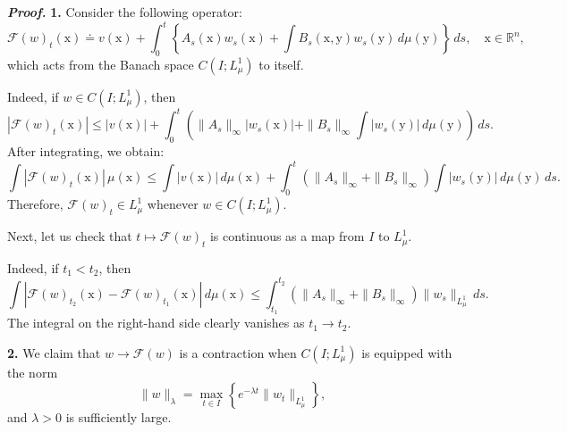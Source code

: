 \documentclass[sn-mathphys-num]{sn-jnl}
\numberwithin{equation}{section}
\theoremstyle{mythm}
\theoremstyle{mydef}
\renewenvironment{proof}{\smallskip\noindent\emph{\textbf{Proof.}}%
  \hspace{1pt}}{\hspace{-5pt}{\nobreak\quad\nobreak\hfill\nobreak%
    $\square$\vspace{2pt}\par}\smallskip\goodbreak}
\renewcommand{\d}{\,d}
\begin{document}
\begin{proof}
\textbf{1.} Consider the following operator:
\[
\mathcal{F}(w)_t(\mathrm{x}) \doteq v(\mathrm{x}) + \int_{0}^t \left\{A_s(\mathrm{x}) w_s(\mathrm{x}) + \int B_s(\mathrm{x},\mathrm{y}) w_s(\mathrm{y}) \d \mu(\mathrm{y}) \right\} \, ds, \quad \mathrm{x} \in \mathbb{R}^n,
\]
which acts from the Banach space \( C\left(I;L^1_{\mu}\right) \) to itself.

Indeed, if \( w \in C\left(I;L^1_{\mu}\right) \), then
\[
|\mathcal{F}(w)_t(\mathrm{x})| \le |v(\mathrm{x})| + \int_{0}^t \left( \|A_s\|_{\infty} |w_s(\mathrm{x})| + \|B_s\|_{\infty} \int |w_s(\mathrm{y})| \d \mu(\mathrm{y}) \right) \, ds.
\]
After integrating, we obtain:
\[
\int |\mathcal{F}(w)_t(\mathrm{x})| \, \mu(\mathrm{x}) \le \int |v(\mathrm{x})| \d \mu(\mathrm{x}) + \int_{0}^t \left( \|A_s\|_{\infty} + \|B_s\|_{\infty} \right) \int |w_s(\mathrm{y})| \d \mu(\mathrm{y}) \, ds.
\]
Therefore, \( \mathcal{F}(w)_t \in L^1_{\mu} \) whenever \( w \in C\left(I;L^1_{\mu}\right) \).

Next, let us check that \( t \mapsto \mathcal{F}(w)_t \) is continuous as a map from \( I \) to \( L^1_{\mu} \).

Indeed, if \( t_1 < t_2 \), then
\[
\int |\mathcal{F}(w)_{t_2}(\mathrm{x}) - \mathcal{F}(w)_{t_1}(\mathrm{x})| \d \mu(\mathrm{x}) \le \int_{t_1}^{t_2} \left( \|A_s\|_{\infty} + \|B_s\|_{\infty} \right) \|w_s\|_{L^1_{\mu}} \, ds.
\]
The integral on the right-hand side clearly vanishes as \( t_1 \to t_2 \).

\textbf{2.} We claim that \( w \to \mathcal{F}(w) \) is a contraction when \( C(I;L^1_{\mu}) \) is equipped with the norm
\begin{equation}
  \label{eq:lambdanorm}
\|w\|_{\lambda} = \max_{t \in I} \left\{ e^{-\lambda t} \|w_t\|_{L^1_{\mu}} \right\},
\end{equation}
and \( \lambda > 0 \) is sufficiently large.


\end{proof}
\end{document}
